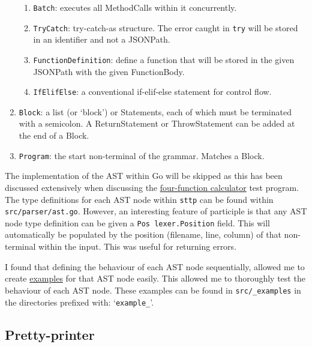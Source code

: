 \begin{enumerate}
\begin{enumerate}
        \item \verb|Batch|: executes all MethodCalls within it concurrently.
        \item \verb|TryCatch|: try-catch-as structure. The error caught in \verb|try| will be stored in an identifier and not a JSONPath.
        \item \verb|FunctionDefinition|: define a function that will be stored in the given JSONPath with the given FunctionBody.
        \item \verb|IfElifElse|: a conventional if-elif-else statement for control flow.
    \end{enumerate}
    \item \verb|Block|: a list (or `block') or Statements, each of which must be terminated with a semicolon. A ReturnStatement or ThrowStatement can be added at the end of a Block.
    \item \verb|Program|: the start non-terminal of the grammar. Matches a Block.
\end{enumerate}

The implementation of the AST within Go will be skipped as this has been discussed extensively when discussing the \hyperref[sec:four-function-calc]{four-function calculator} test program. The type definitions for each AST node within \verb|sttp| can be found within \verb|src/parser/ast.go|. However, an interesting feature of participle is that any AST node type definition can be given a \texttt{Pos lexer.Position} field. This will automatically be populated by the position (filename, line, column) of that non-terminal within the input. This was useful for returning errors.

I found that defining the behaviour of each AST node sequentially, allowed me to create \hyperref[appendix:sttp-examples]{examples} for that AST node easily. This allowed me to thoroughly test the behaviour of each AST node. These examples can be found in \verb|src/_examples| in the directories prefixed with: `\verb|example_|'.

\subsection{Pretty-printer}

